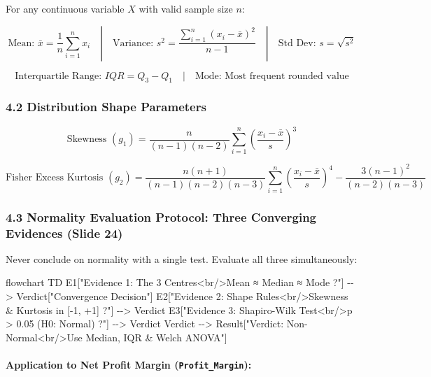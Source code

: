 \documentclass[
]{article}
\newenvironment{Shaded}{}{}
\newcommand{\NormalTok}[1]{#1}
\begin{document}
For any continuous variable \(X\) with valid sample size \(n\):

\[\text{Mean: } \bar{x} = \frac{1}{n} \sum_{i=1}^n x_i \quad | \quad \text{Variance: } s^2 = \frac{\sum_{i=1}^n (x_i - \bar{x})^2}{n - 1} \quad | \quad \text{Std Dev: } s = \sqrt{s^2}\]

\[\text{Interquartile Range: } IQR = Q_3 - Q_1 \quad | \quad \text{Mode: Most frequent rounded value}\]

\subsubsection{4.2 Distribution Shape
Parameters}\label{distribution-shape-parameters}

\[\text{Skewness } (g_1) = \frac{n}{(n-1)(n-2)} \sum_{i=1}^n \left(\frac{x_i - \bar{x}}{s}\right)^3\]

\[\text{Fisher Excess Kurtosis } (g_2) = \frac{n(n+1)}{(n-1)(n-2)(n-3)} \sum_{i=1}^n \left(\frac{x_i - \bar{x}}{s}\right)^4 - \frac{3(n-1)^2}{(n-2)(n-3)}\]

\subsubsection{4.3 Normality Evaluation Protocol: Three Converging
Evidences (Slide
24)}\label{normality-evaluation-protocol-three-converging-evidences-slide-24}

Never conclude on normality with a single test. Evaluate all three
simultaneously:

\begin{Shaded}
\begin{Highlighting}[]
\NormalTok{flowchart TD}
\NormalTok{    E1["Evidence 1: The 3 Centres\textless{}br/\textgreater{}Mean ≈ Median ≈ Mode ?"] {-}{-}\textgreater{} Verdict["Convergence Decision"]}
\NormalTok{    E2["Evidence 2: Shape Rules\textless{}br/\textgreater{}Skewness \& Kurtosis in [{-}1, +1] ?"] {-}{-}\textgreater{} Verdict}
\NormalTok{    E3["Evidence 3: Shapiro{-}Wilk Test\textless{}br/\textgreater{}p \textgreater{} 0.05 (H0: Normal) ?"] {-}{-}\textgreater{} Verdict}
\NormalTok{    Verdict {-}{-}\textgreater{} Result["Verdict: Non{-}Normal\textless{}br/\textgreater{}Use Median, IQR \& Welch ANOVA"]}
\end{Highlighting}
\end{Shaded}

\paragraph{\texorpdfstring{Application to Net Profit Margin
(\texttt{Profit\_Margin}):}{Application to Net Profit Margin (Profit\_Margin):}}\label{application-to-net-profit-margin-profit_margin}
\end{document}
